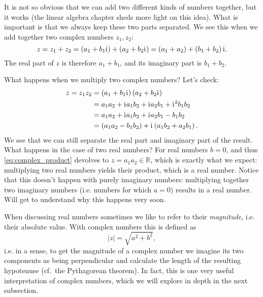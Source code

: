 It is not so obvious that we can add two different kinds of numbers together, but it works (the linear algebra chapter sheds more light on this idea). What is important is that we always keep these two parts separated. We see this when we add together two complex numbers $z_{1},z_{2}$:
\begin{equation}
	z = z_{1}+z_{2} = \left( a_{1}+b_{1}\mathrm{i}\mkern1mu \right) + \left( a_{2}+b_{2}\mathrm{i}\mkern1mu \right) = \left( a_{1}+a_{2} \right) + \left( b_{1}+b_{2} \right)\mathrm{i}\mkern1mu.
	\label{eq:complex_addition}
\end{equation}
The real part of $z$ is therefore $a_{1}+b_{1}$, and its imaginary part is $b_{1}+b_{2}$.

What happens when we multiply two complex numbers? Let's check:
\begin{align}
	z = z_{1}z_{2} &= \left( a_{1}+b_{1}\mathrm{i}\mkern1mu \right)\left( a_{2}+b_{2}\mathrm{i}\mkern1mu \right)\nonumber\\
	&= a_{1}a_{2} + \mathrm{i}\mkern1mu a_{1}b_{2} + \mathrm{i}\mkern1mu a_{2}b_{1} + \mathrm{i}\mkern1mu^{2}b_{1}b_{2}\nonumber\\
	&= a_{1}a_{2} + \mathrm{i}\mkern1mu a_{1}b_{2} + \mathrm{i}\mkern1mu a_{2}b_{1} - b_{1}b_{2}\nonumber\\
	&= \left( a_{1}a_{2} - b_{1}b_{2} \right) + \mathrm{i}\mkern1mu\left( a_{1}b_{2} + a_{2}b_{1} \right).
	\label{eq:complex_product}
\end{align}
We see that we can still separate the real part and imaginary part of the result. What happens in the case of two real numbers? For real numbers $b=0$, and thus \autoref{eq:complex_product} devolves to $z=a_{1}a_{2}\in\mathbb{R}$, which is exactly what we expect: multiplying two real numbers yields their product, which is a real number. Notice that this doesn't happen with purely imaginary numbers: multiplying together two imaginary numbers (i.e. numbers for which $a=0$) results in a real number. Will get to understand why this happens very soon.

When discussing real numbers sometimes we like to refer to their \textit{magnitude}, i.e. their absolute value. With complex numbers this is defined as
\begin{equation}
	|z| = \sqrt{a^{2}+b^{2}},
	\label{eq:complex_magnitude}
\end{equation}
i.e. in a sense, to get the magnitude of a complex number we imagine its two components as being perpendicular and calculate the length of the resulting hypotenuse (cf.\ the Pythagorean theorem). In fact, this is one very useful interpretation of complex numbers, which we will explore in depth in the next subsection.

